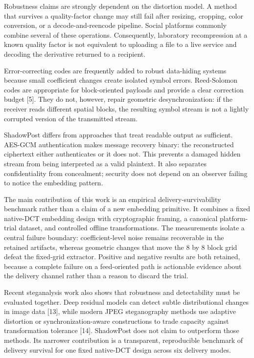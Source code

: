 \documentclass[conference]{IEEEtran}
\begin{document}
Robustness claims are strongly dependent on the distortion model. A method that survives a quality-factor change may still fail after resizing, cropping, color conversion, or a decode-and-reencode pipeline. Social platforms commonly combine several of these operations. Consequently, laboratory recompression at a known quality factor is not equivalent to uploading a file to a live service and decoding the derivative returned to a recipient.

Error-correcting codes are frequently added to robust data-hiding systems because small coefficient changes create isolated symbol errors. Reed-Solomon codes are appropriate for block-oriented payloads and provide a clear correction budget [5]. They do not, however, repair geometric desynchronization: if the receiver reads different spatial blocks, the resulting symbol stream is not a lightly corrupted version of the transmitted stream.

ShadowPost differs from approaches that treat readable output as sufficient. AES-GCM authentication makes message recovery binary: the reconstructed ciphertext either authenticates or it does not. This prevents a damaged hidden stream from being interpreted as a valid plaintext. It also separates confidentiality from concealment; security does not depend on an observer failing to notice the embedding pattern.

The main contribution of this work is an empirical delivery-survivability benchmark rather than a claim of a new embedding primitive. It combines a fixed native-DCT embedding design with cryptographic framing, a canonical platform-trial dataset, and controlled offline transformations. The measurements isolate a central failure boundary: coefficient-level noise remains recoverable in the retained artifacts, whereas geometric changes that move the 8 by 8 block grid defeat the fixed-grid extractor. Positive and negative results are both retained, because a complete failure on a feed-oriented path is actionable evidence about the delivery channel rather than a reason to discard the trial.

Recent steganalysis work also shows that robustness and detectability must be evaluated together. Deep residual models can detect subtle distributional changes in image data [13], while modern JPEG steganography methods use adaptive distortion or synchronization-aware constructions to trade capacity against transformation tolerance [14]. ShadowPost does not claim to outperform those methods. Its narrower contribution is a transparent, reproducible benchmark of delivery survival for one fixed native-DCT design across six delivery modes.
\end{document}
